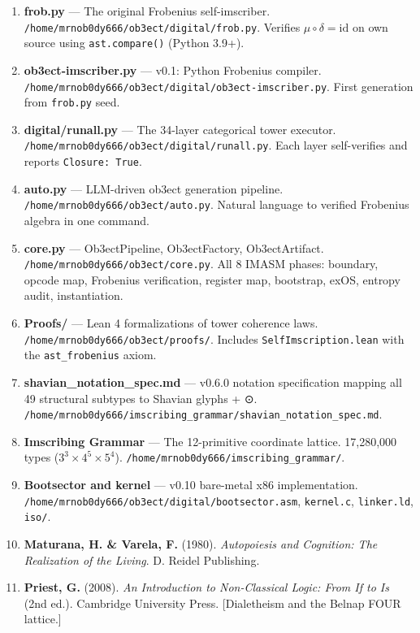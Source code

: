 \documentclass[12pt,a4paper]{article}
\begin{document}
\begin{enumerate}
    \item \textbf{frob.py} --- The original Frobenius self-imscriber. \texttt{/home/mrnob0dy666/ob3ect/digital/frob.py}. Verifies $\mu\circ\delta = \mathrm{id}$ on own source using \texttt{ast.compare()} (Python 3.9+).
    \item \textbf{ob3ect-imscriber.py} --- v0.1: Python Frobenius compiler. \texttt{/home/mrnob0dy666/ob3ect/digital/ob3ect-imscriber.py}. First generation from \texttt{frob.py} seed.
    \item \textbf{digital/runall.py} --- The 34-layer categorical tower executor. \texttt{/home/mrnob0dy666/ob3ect/digital/runall.py}. Each layer self-verifies and reports \texttt{Closure: True}.
    \item \textbf{auto.py} --- LLM-driven ob3ect generation pipeline. \texttt{/home/mrnob0dy666/ob3ect/auto.py}. Natural language to verified Frobenius algebra in one command.
    \item \textbf{core.py} --- Ob3ectPipeline, Ob3ectFactory, Ob3ectArtifact. \texttt{/home/mrnob0dy666/ob3ect/core.py}. All 8 IMASM phases: boundary, opcode map, Frobenius verification, register map, bootstrap, exOS, entropy audit, instantiation.
    \item \textbf{Proofs/} --- Lean 4 formalizations of tower coherence laws. \texttt{/home/mrnob0dy666/ob3ect/proofs/}. Includes \texttt{SelfImscription.lean} with the \texttt{ast\_frobenius} axiom.
    \item \textbf{shavian\_notation\_spec.md} --- v0.6.0 notation specification mapping all 49 structural subtypes to Shavian glyphs + ⊙. \texttt{/home/mrnob0dy666/imscribing\_grammar/shavian\_notation\_spec.md}.
    \item \textbf{Imscribing Grammar} --- The 12-primitive coordinate lattice. 17,280,000 types ($3^3 \times 4^5 \times 5^4$). \texttt{/home/mrnob0dy666/imscribing\_grammar/}.
    \item \textbf{Bootsector and kernel} --- v0.10 bare-metal x86 implementation. \texttt{/home/mrnob0dy666/ob3ect/digital/bootsector.asm}, \texttt{kernel.c}, \texttt{linker.ld}, \texttt{iso/}.
    \item \textbf{Maturana, H. \& Varela, F.} (1980). \emph{Autopoiesis and Cognition: The Realization of the Living}. D. Reidel Publishing.
    \item \textbf{Priest, G.} (2008). \emph{An Introduction to Non-Classical Logic: From If to Is} (2nd ed.). Cambridge University Press. {[}Dialetheism and the Belnap FOUR lattice.{]}
\end{enumerate}
\end{document}
